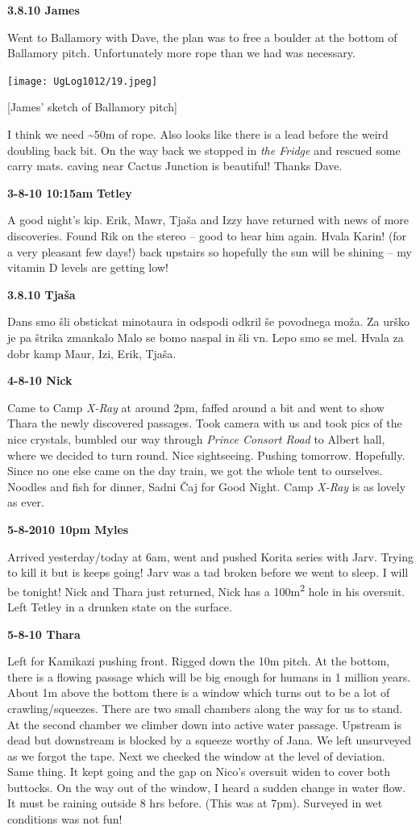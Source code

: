 \textbf{3.8.10 James}

Went to Ballamory with Dave, the plan was to free a boulder at the
bottom of Ballamory pitch. Unfortunately more rope than we had was
necessary.

\texttt{[image: UgLog1012/19.jpeg]}

{[}James' sketch of Ballamory pitch{]}

I think we need \textasciitilde{}50m of rope. Also looks like there is a
lead before the weird doubling back bit. On the way back we stopped in
\emph{the Fridge} and rescued some carry mats. caving near Cactus
Junction is beautiful! Thanks Dave.

\textbf{3-8-10 10:15am} \textbf{Tetley}

A good night's kip. Erik, Mawr, Tjaša and Izzy have returned with news
of more discoveries. Found Rik on the stereo -- good to hear him again.
Hvala Karin! (for a very pleasant few days!) back upstairs so hopefully
the sun will be shining -- my vitamin D levels are getting low!

\textbf{3.8.10 Tjaša}

Dans smo šli obstickat minotaura in odspodi odkril še povodnega moža. Za
urško je pa štrika zmankalo Malo se bomo naspal in šli vn. Lepo smo se
mel. Hvala za dobr kamp Maur, Izi, Erik, Tjaša.

\textbf{4-8-10 Nick}

Came to Camp \emph{X-Ray} at around 2pm, faffed around a bit and went to
show Thara the newly discovered passages. Took camera with us and took
pics of the nice crystals, bumbled our way through \emph{Prince Consort
Road} to Albert hall, where we decided to turn round. Nice sightseeing.
Pushing tomorrow. Hopefully. Since no one else came on the day train, we
got the whole tent to ourselves. Noodles and fish for dinner, Sadni Čaj
for Good Night. Camp \emph{X-Ray} is as lovely as ever.

\textbf{5-8-2010 10pm Myles}

Arrived yesterday/today at 6am, went and pushed Korita series with Jarv.
Trying to kill it but is keeps going! Jarv was a tad broken before we
went to sleep. I will be tonight! Nick and Thara just returned, Nick has
a 100m\textsuperscript{2} hole in his oversuit. Left Tetley in a drunken
state on the surface.

\textbf{5-8-10 Thara}

Left for Kamikazi pushing front. Rigged down the 10m pitch. At the
bottom, there is a flowing passage which will be big enough for humans
in 1 million years. About 1m above the bottom there is a window which
turns out to be a lot of crawling/squeezes. There are two small chambers
along the way for us to stand. At the second chamber we climber down
into active water passage. Upstream is dead but downstream is blocked by
a squeeze worthy of Jana. We left unsurveyed as we forgot the tape. Next
we checked the window at the level of deviation. Same thing. It kept
going and the gap on Nico's oversuit widen to cover both buttocks. On
the way out of the window, I heard a sudden change in water flow. It
must be raining outside 8 hrs before. (This was at 7pm). Surveyed in wet
conditions was not fun!

